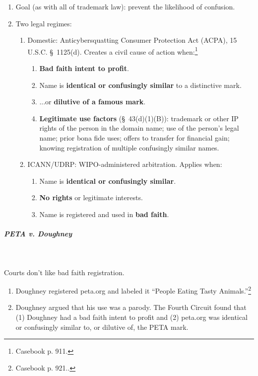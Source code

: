 \begin{enumerate}
    \item Goal (as with all of trademark law): prevent the likelihood of 
    confusion.
    \item Two legal regimes:
    \begin{enumerate}
        \item Domestic: Anticybersquatting Consumer Protection Act (ACPA), 15 
        U.S.C. \S\ 1125(d). Creates a civil cause of action 
        when:\footnote{Casebook p. 911.}
        \begin{enumerate}
            \item \textbf{Bad faith intent to profit}.
            \item Name is \textbf{identical or confusingly similar} to a 
            distinctive mark.
            \item ...or \textbf{dilutive of a famous mark}.
            \item \textbf{Legitimate use factors} (\S\ 43(d)(1)(B)): trademark 
            or other IP rights of the person in the domain name; use of the 
            person's legal name; prior bona fide uses; offers to transfer for 
            financial gain; knowing registration of multiple confusingly 
            similar names.
        \end{enumerate}
        \item ICANN/UDRP: WIPO-administered arbitration. Applies when:
        \begin{enumerate}
            \item Name is \textbf{identical or confusingly similar}.
            \item \textbf{No rights} or legitimate interests.
            \item Name is registered and used in \textbf{bad faith}.
        \end{enumerate}
    \end{enumerate}
\end{enumerate}

\paragraph{\emph{PETA v. Doughney}}
~\\\\
Courts don't like bad faith registration.

\begin{enumerate}
    \item Doughney registered peta.org and labeled it ``People Eating Tasty 
    Animals.''\footnote{Casebook p. 921..}
    \item Doughney argued that his use was a parody. The Fourth Circuit found 
    that (1) Doughney had a bad faith intent to profit and (2) peta.org was 
    identical or confusingly similar to, or dilutive of, the PETA mark.
\end{enumerate}

